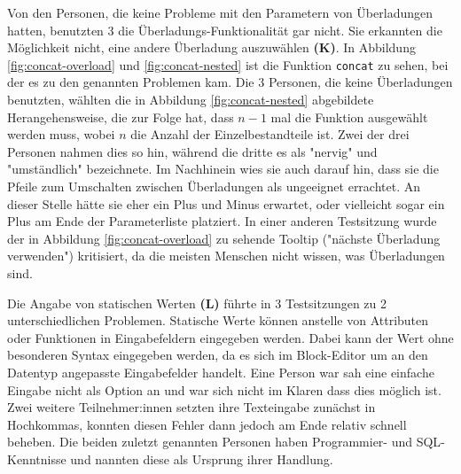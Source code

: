 Von den Personen, die keine Probleme mit den Parametern von Überladungen hatten, benutzten 3 die Überladungs-Funktionalität gar nicht. Sie erkannten die Möglichkeit nicht, eine andere Überladung auszuwählen \textbf{(K)}. In Abbildung \ref{fig:concat-overload} und \ref{fig:concat-nested} ist die Funktion \texttt{concat} zu sehen, bei der es zu den genannten Problemen kam. Die 3 Personen, die keine Überladungen benutzten, wählten die in Abbildung \ref{fig:concat-nested} abgebildete Herangehensweise, die zur Folge hat, dass $n-1$ mal die Funktion ausgewählt werden muss, wobei $n$ die Anzahl der Einzelbestandteile ist. Zwei der drei Personen nahmen dies so hin, während die dritte es als "nervig" und "umständlich" bezeichnete.  Im Nachhinein wies sie auch darauf hin, dass sie die Pfeile zum Umschalten zwischen Überladungen als ungeeignet errachtet. An dieser Stelle hätte sie eher ein Plus und Minus erwartet, oder vielleicht sogar ein Plus am Ende der Parameterliste platziert. In einer anderen Testsitzung wurde der in Abbildung \ref{fig:concat-overload} zu sehende Tooltip ("nächste Überladung verwenden") kritisiert, da die meisten Menschen nicht wissen, was Überladungen sind. 

Die Angabe von statischen Werten \textbf{(L)} führte in 3 Testsitzungen zu 2 unterschiedlichen Problemen. Statische Werte können anstelle von Attributen oder Funktionen in Eingabefeldern eingegeben werden. Dabei kann der Wert ohne besonderen Syntax eingegeben werden, da es sich im Block-Editor um an den Datentyp angepasste Eingabefelder handelt. Eine Person war sah eine einfache Eingabe nicht als Option an und war sich nicht im Klaren dass dies möglich ist. Zwei weitere Teilnehmer:innen setzten ihre Texteingabe zunächst in Hochkommas, konnten diesen Fehler dann jedoch am Ende relativ schnell beheben. Die beiden zuletzt genannten Personen haben Programmier- und \ac{SQL}-Kenntnisse und nannten diese als Ursprung ihrer Handlung.

